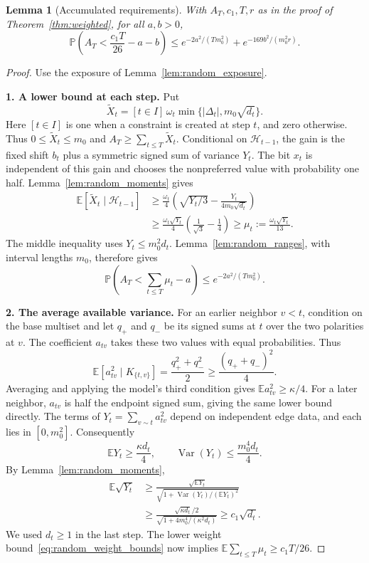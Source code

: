 \documentclass[11pt,a4paper]{article}
\newtheorem{lemma}[theorem]{Lemma}
\theoremstyle{definition}
\theoremstyle{remark}
\newcommand{\E}{\mathbb E}
\newcommand{\Prb}{\mathbb P}
\begin{document}
\begin{lemma}[Accumulated requirements]\label{lem:random_requirements}
With $A_T,c_1,T,r$ as in the proof of Theorem~\ref{thm:weighted},
for all $a,b>0$,
\[
 \Prb\left(A_T<\frac{c_1T}{26}-a-b\right)
 \le e^{-2a^2/(Tm_0^2)}+e^{-169b^2/(m_0^2r)}.
\]
\end{lemma}
\begin{proof}
Use the exposure of Lemma~\ref{lem:random_exposure}.

\par\medskip\noindent\textbf{1. A lower bound at each step.}
Put
\[
 \widetilde X_t=[t\in I]\,\omega_t
            \min\{|\Delta_t|,m_0\sqrt{d_t}\}.
\]
Here $[t\in I]$ is one when a constraint is created at step $t$,
and zero otherwise. Thus $0\le\widetilde X_t\le m_0$ and
$A_T\ge\sum_{t\le T}\widetilde X_t$.
Conditional on $\mathcal H_{t-1}$, the gain is the fixed shift $b_t$
plus a symmetric signed sum of variance $Y_t$.
The bit $x_t$ is independent of this gain and chooses the nonpreferred
value with probability one half. Lemma~\ref{lem:random_moments} gives
\begin{align*}
 \E[\widetilde X_t\mid\mathcal H_{t-1}]
 &\ge\frac{\omega_t}{4}
       \left(\sqrt{Y_t/3}-\frac{Y_t}{4m_0\sqrt{d_t}}\right)\\
 &\ge\frac{\omega_t\sqrt{Y_t}}4
             \left(\frac1{\sqrt3}-\frac14\right)
 \ge \mu_t:=\frac{\omega_t\sqrt{Y_t}}{13}.
\end{align*}
The middle inequality uses $Y_t\le m_0^2d_t$.
Lemma~\ref{lem:random_ranges}, with interval lengths $m_0$, therefore gives
\[
 \Prb\left(A_T<\sum_{t\le T}\mu_t-a\right)
 \le e^{-2a^2/(Tm_0^2)}.
\]

\par\medskip\noindent\textbf{2. The average available variance.}
For an earlier neighbor $v<t$, condition on the base multiset and let
$q_+$ and $q_-$ be its signed sums at $t$ over the two polarities at $v$.
The coefficient $a_{tv}$ takes these two values with equal probabilities.
Thus
\[
 \E[a_{tv}^2\mid K_{\{t,v\}}]
 =\frac{q_+^2+q_-^2}{2}
 \ge\frac{(q_++q_-)^2}{4}.
\]
Averaging and applying the model's third condition gives
$\E a_{tv}^2\ge\kappa/4$. For a later neighbor, $a_{tv}$ is half
the endpoint signed sum, giving the same lower bound directly.
The terms of $Y_t=\sum_{v\sim t}a_{tv}^2$ depend on independent edge
data, and each lies in $[0,m_0^2]$. Consequently
\[
 \E Y_t\ge\frac{\kappa d_t}{4},\qquad
 \operatorname{Var}(Y_t)\le\frac{m_0^4d_t}{4}.
\]
By Lemma~\ref{lem:random_moments},
\begin{align*}
 \E\sqrt{Y_t}
 &\ge\frac{\sqrt{\E Y_t}}
              {\sqrt{1+\operatorname{Var}(Y_t)/(\E Y_t)^2}}\\
 &\ge
 \frac{\sqrt{\kappa d_t}/2}
      {\sqrt{1+4m_0^4/(\kappa^2d_t)}}
 \ge c_1\sqrt{d_t}.
\end{align*}
We used $d_t\ge1$ in the last step.
The lower weight bound~\eqref{eq:random_weight_bounds} now implies
$\E\sum_{t\le T}\mu_t\ge c_1T/26$.


\end{proof}
\end{document}
